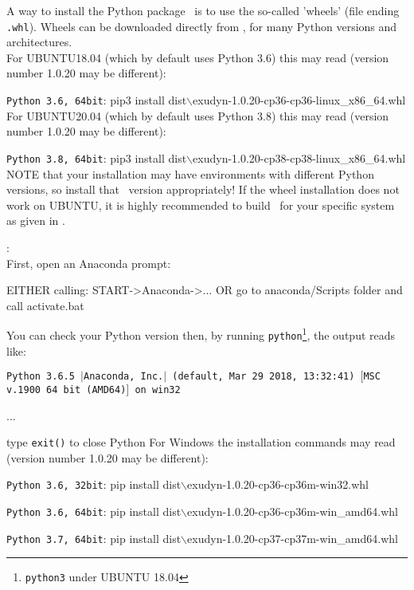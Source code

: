 A way to install the Python package \codeName\ is to use the so-called 'wheels' (file ending \texttt{.whl}).
Wheels can be downloaded directly from , for many Python versions and architectures.
\vspace{6pt}\\
For UBUNTU18.04 (which by default uses Python 3.6) this may read (version number 1.0.20 may be different):
\bi
  \item \texttt{Python 3.6, 64bit}: pip3 install dist$\backslash$exudyn-1.0.20-cp36-cp36-linux\_x86\_64.whl
\ei
For UBUNTU20.04 (which by default uses Python 3.8) this may read (version number 1.0.20 may be different):
\bi
  \item \texttt{Python 3.8, 64bit}: pip3 install dist$\backslash$exudyn-1.0.20-cp38-cp38-linux\_x86\_64.whl
\ei
NOTE that your installation may have environments with different Python versions, so install that \codeName\ version appropriately!
If the wheel installation does not work on UBUNTU, it is highly recommended to build \codeName\ for your specific system as given in .

\noindent {}:\vspace{6pt}\\
First, open an Anaconda prompt:
\bi
  \item EITHER calling: START->Anaconda->... OR go to anaconda/Scripts folder and call activate.bat
  \item You can check your Python version then, by running \texttt{python}\footnote{\texttt{python3} under UBUNTU 18.04}, the output reads like:
  \bi
    \item[] \texttt{Python 3.6.5 $|$Anaconda, Inc.$|$ (default, Mar 29 2018, 13:32:41) $[$MSC v.1900 64 bit (AMD64)$]$ on win32}
    \item[] ...
  \ei
  \item type \texttt{exit()} to close Python
\ei
%
%
For Windows the installation commands may read (version number 1.0.20 may be different):
\bi
  \item \texttt{Python 3.6, 32bit}: pip install dist$\backslash$exudyn-1.0.20-cp36-cp36m-win32.whl
  \item \texttt{Python 3.6, 64bit}: pip install dist$\backslash$exudyn-1.0.20-cp36-cp36m-win\_amd64.whl
  \item \texttt{Python 3.7, 64bit}: pip install dist$\backslash$exudyn-1.0.20-cp37-cp37m-win\_amd64.whl
\ei

